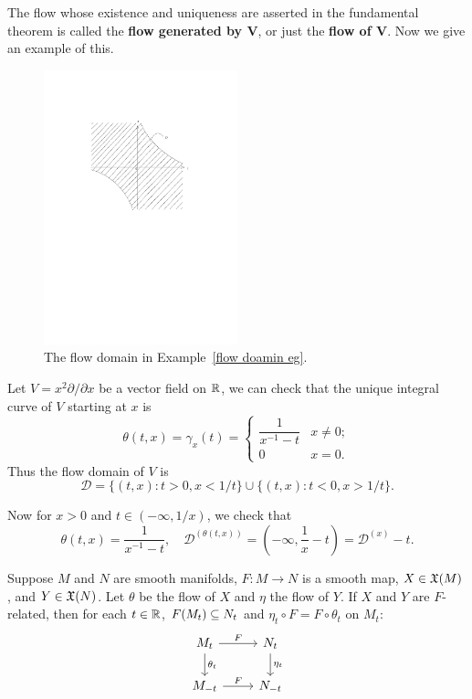 The flow whose existence and uniqueness are asserted in the fundamental theorem is called the \textbf{flow generated by $\bm{V}$}, or just the \textbf{flow of $\bm{V}$}. Now we give an example of this.
\begin{figure}[htbp]
\centering
\includegraphics[width=0.5\textwidth]{pictures/flow-domain-eg}
\caption{The flow domain in Example~\ref{flow doamin eg}.}
\end{figure}
\begin{example}\label{flow doamin eg}
Let $V=x^2\partial/\partial x$ be a vector field on $\mathbb{R}$, we can check that the unique integral curve of $V$ starting at $x$ is
\[\theta(t,x)=\gamma_x(t)=\begin{cases}
\dfrac{1}{x^{-1}-t}&x\neq 0;\\
0&x=0.
\end{cases}\]
Thus the flow domain of $V$ is 
\[\mathcal{D}=\{(t,x):t>0,x<1/t\}\cup\{(t,x):t<0,x>1/t\}.\]

Now for $x>0$ and $t\in(-\infty,1/x)$, we check that
\[\theta(t,x)=\frac{1}{x^{-1}-t},\quad \mathcal{D}^{(\theta(t,x))}=(-\infty,\frac{1}{x}-t)=\mathcal{D}^{(x)}-t.\]
\end{example}
\begin{theorem}\label{flow naturality}
Suppose $M$ and $N$ are smooth manifolds, $F:M\to N$ is a smooth map, $X\in\mathfrak{X}(M)$, and $Y\in\mathfrak{X}(N)$. Let $\theta$ be the flow of $X$ and $\eta$ the flow of $Y$. If $X$ and $Y$ are $F$-related, then for each $t\in\mathbb{R}$, $F(M_t)\subseteq N_t$ and $\eta_t\circ F=F\circ\theta_t$ on $M_t$:
\[\begin{tikzcd}
M_t\ar[d,"\theta_t"]\ar[r,"F"]&N_t\ar[d,"\eta_t"]\\
M_{-t}\ar[r,"F"]&N_{-t}
\end{tikzcd}\]
\end{theorem}
